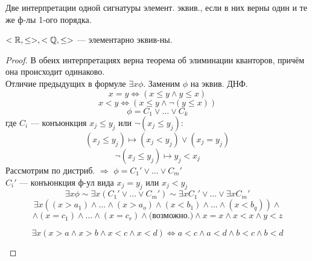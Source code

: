 \begin{definition}
Две интерпретации одной сигнатуры элемент. эквив., если в них верны один и те же ф-лы 1-ого порядка.
\end{definition}
\begin{theorem}
$<\mathbb{R}, \leq>, <\mathbb{Q}, \leq>$ --- элементарно эквив-ны.
\end{theorem}
\begin{proof}
В обеих интерпретациях верна теорема об элиминации кванторов, причём она происходит одинаково. \\
Отличие предыдущих в формуле $\exists x \phi$. Заменим $\phi$ на эквив. ДНФ.
\[
  x = y \iff (x \leq y \land y \leq x)
\]
\[
  x < y \iff (x \leq y \land \neg (y \leq x))
\]
\[
  \phi = C_1 \lor \ldots \lor C_k
\]
где $C_i$ --- конъюнкция $x_j \leq y_j$ или $\neg(x_j \leq y_j)$:
\[
  (x_j \leq y_j) \mapsto (x_j < y_j) \lor (x_j = y_j)
\]
\[
  \neg(x_j \leq y_j) \mapsto y_j < x_j
\]
 Рассмотрим по дистриб. $\Rightarrow$ $\phi = C_1' \lor \ldots \lor C_m'$ \\
 $C_i'$ --- конъюнкция ф-ул вида $x_j = y_j$ или $x_j < y_j$
 \[
  \exists x \phi \sim \exists x (C_1' \lor \ldots \lor C_m') \sim \exists x C_1' \lor \ldots \lor \exists x C_m' 
 \]
 \[
 \exists x ((x > a_1) \land \ldots \land (x > a_o) \land (x < b_1) \land \ldots \land (x < b_q)) \land
 \]
 \[
  \land (x = c_1) \land \ldots \land (x = c_r) \land \text{(возможно.)} \land x = x \land x < x \land y < z
 \]
 \begin{example}
 \[
 \exists x (x > a \land x > b \land x < c \land x < d) \iff a < c \land a < d \land b < c \land b < d
 \]
 \end{example}
\end{proof}
